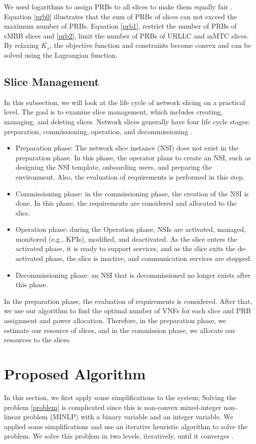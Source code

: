 \documentclass[lettersize,journal]{IEEEtran}
\begin{document}
We used logarithms to assign PRBs to all slices to make them equally fair \cite{marabissi2019highly}.
Equation \eqref{prb0} illustrates that the sum of PRBs of slices can not exceed the maximum number of PRBs.
Equation \eqref{prb1}, restrict the number of PRBs of eMBB slices and \eqref{prb2}, limit the number of PRBs of URLLC and mMTC slices. By relaxing $\bar{K_s}$, the objective function and constraints become convex and can be solved using the Lagrangian function.

\subsection{Slice Management}
In this subsection, we will look at the life cycle of network slicing on a practical level. 
The goal is to examine slice management, which includes creating, managing, and deleting slices. Network slices generally have four life cycle stages: preparation, commissioning, operation, and decommissioning \cite{ETSI2}.
\begin{itemize}
\item Preparation phase: The network slice instance (NSI) does not exist in the preparation phase. In this phase, the operator plans to create an NSI, such as designing the NSI template, onboarding users, and preparing the environment. Also, the evaluation of requirements is performed in this step.
\item Commissioning phase: in the commissioning phase, the creation of the NSI is done. In this phase, the requirements are considered and allocated to the slice.
\item Operation phase: during the Operation phase, NSIs are activated, managed, monitored (e.g., KPIs), modified, and deactivated. As the slice enters the activated phase, it is ready to support services, and as the slice exits the de-activated phase, the slice is inactive, and communication services are stopped.
\item Decommissioning phase: an NSI that is decommissioned no longer exists after this phase.
\end{itemize}
In the preparation phase, the evaluation of requirements is considered. After that, we use our algorithm to find the optimal number of VNFs for each slice and PRB assignment and power allocation. Therefore, in the preparation phase, we estimate our resource of slices, and in the commission phase, we allocate our resources to the slices.
\section{Proposed Algorithm}\label{proAlg}
In this section, we first apply some simplifications to the system; Solving the problem \eqref{problem} is complicated since this is non-convex mixed-integer non-linear problem (MINLP) with a binary variable and an integer variable.
We applied some simplifications and use an iterative heuristic algorithm to solve the problem.
We solve this problem in two levels, iteratively, until it converges \cite{ali2018joint}.
\end{document}
